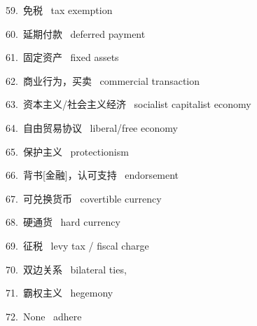 \documentclass[a4paper, 12pt]{article}
\begin{document}
\begin{multicols}{2}
\begin{flushleft}
59.\ 免税 \ tax exemption
\end{flushleft}

\begin{flushleft}
60.\ 延期付款 \ deferred payment
\end{flushleft}
\end{multicols}

\begin{multicols}{2}
\begin{flushleft}
61.\ 固定资产 \ fixed assets
\end{flushleft}

\begin{flushleft}
62.\ 商业行为，买卖 \ commercial transaction
\end{flushleft}
\end{multicols}

\begin{multicols}{2}
\begin{flushleft}
63.\ 资本主义/社会主义经济 \ socialist capitalist economy
\end{flushleft}

\begin{flushleft}
64.\ 自由贸易协议 \ liberal/free economy
\end{flushleft}
\end{multicols}

\begin{multicols}{2}
\begin{flushleft}
65.\ 保护主义 \ protectionism
\end{flushleft}

\begin{flushleft}
66.\ 背书[金融]，认可支持 \ endorsement
\end{flushleft}
\end{multicols}

\begin{multicols}{2}
\begin{flushleft}
67.\ 可兑换货币 \ covertible currency
\end{flushleft}

\begin{flushleft}
68.\ 硬通货 \ hard currency
\end{flushleft}
\end{multicols}

\begin{multicols}{2}
\begin{flushleft}
69.\ 征税 \ levy tax / fiscal charge
\end{flushleft}

\begin{flushleft}
70.\ 双边关系 \ bilateral ties, 
\end{flushleft}
\end{multicols}

\begin{multicols}{2}
\begin{flushleft}
71.\ 霸权主义 \ hegemony
\end{flushleft}

\begin{flushleft}
72.\ None \ adhere 
\end{flushleft}
\end{multicols}
\end{document}
